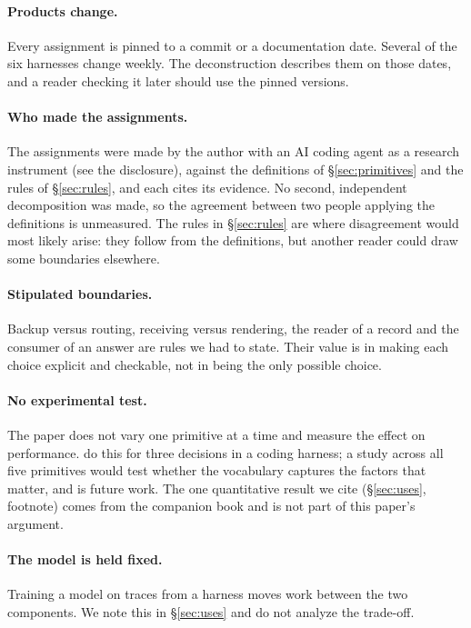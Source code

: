 \paragraph{Products change.} Every assignment is pinned to a commit or a documentation date. Several of the six harnesses change weekly. The deconstruction describes them on those dates, and a reader checking it later should use the pinned versions.

\paragraph{Who made the assignments.} The assignments were made by the author with an AI coding agent as a research instrument (see the disclosure), against the definitions of \S\ref{sec:primitives} and the rules of \S\ref{sec:rules}, and each cites its evidence. No second, independent decomposition was made, so the agreement between two people applying the definitions is unmeasured. The rules in \S\ref{sec:rules} are where disagreement would most likely arise: they follow from the definitions, but another reader could draw some boundaries elsewhere.

\paragraph{Stipulated boundaries.} Backup versus routing, receiving versus rendering, the reader of a record and the consumer of an answer are rules we had to state. Their value is in making each choice explicit and checkable, not in being the only possible choice.

\paragraph{No experimental test.} The paper does not vary one primitive at a time and measure the effect on performance. \citet{fan2026empirical} do this for three decisions in a coding harness; a study across all five primitives would test whether the vocabulary captures the factors that matter, and is future work. The one quantitative result we cite (\S\ref{sec:uses}, footnote) comes from the companion book and is not part of this paper's argument.

\paragraph{The model is held fixed.} Training a model on traces from a harness moves work between the two components. We note this in \S\ref{sec:uses} and do not analyze the trade-off.
